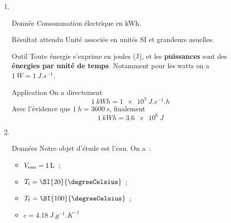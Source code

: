 \documentclass[../main/main.tex]{subfiles}
\begin{document}
\begin{enumerate}
    \item ~
        \begin{tcbraster}[raster columns=3, raster equal height=rows]
            \begin{tcolorbox}[blankest, space to=\myspace]
                \begin{tcbraster}[raster columns=1]
                    \begin{NCdefi}[]{Donnée}
                        Consommation électrique en \si{kWh}.
                    \end{NCdefi}
                    \begin{NCprop}[add to natural height=\myspace]{Résultat attendu}
                        Unité associée en unités SI et grandeurs usuelles.
                    \end{NCprop}
                \end{tcbraster}
            \end{tcolorbox}
        \begin{NCrapp}[raster multicolumn=1]{Outil}
            Toute énergie s'exprime en joules (J), et les \textbf{puissances} sont des
            \textbf{énergies par unité de temps}. Notamment pour les
            watts on a $\SI{1}{W} = \SI{1}{J.s^{-1}}$.
        \end{NCrapp}
        \begin{NCexem}[raster multicolumn=1]{Application}
            On a directement
            \[ \SI{1}{kWh} = \SI{1e3}{J.s^{-1}.h}\]
            Avec l'évidence que $ \SI{1}{h} = \SI{3600}{s}$, finalement
            \[\boxed{\SI{1}{kWh} = \SI{3.6e6}{J}}\]
        \end{NCexem}
        \end{tcbraster}
    \item ~
        \begin{tcbraster}[raster columns=2, raster equal height=rows]
            \begin{NCdefi}[]{Données}
                Notre objet d'étude est l'eau. On a~:
                \begin{itemize}
                    \item $V_{\rm eau} = \SI{1}{L}$~;
                    \item $T_{\rm i} = \SI{20}{\degreeCelsius}$~;
                    \item $T_{\rm f} = \SI{100}{\degreeCelsius}$~;
                    \item $c = \SI{4.18}{J.g^{-1}.K^{-1}}$

\end{itemize}
\end{NCdefi}
\end{tcbraster}
\end{enumerate}
\end{document}
